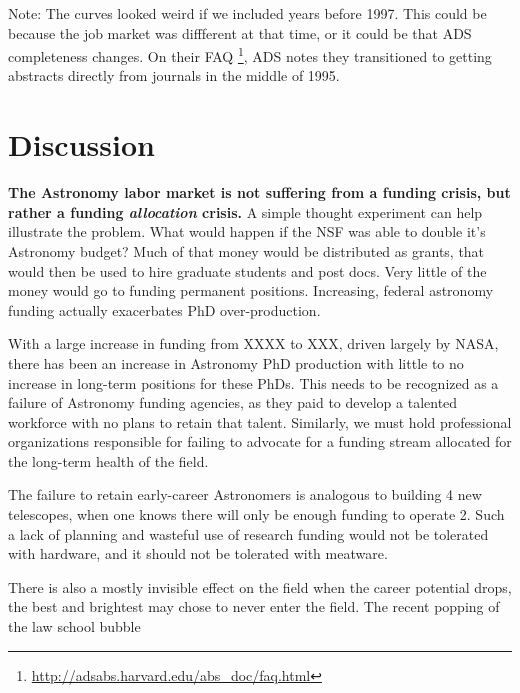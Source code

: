 \documentclass{emulateapj}
\begin{document}

Note:  The curves looked weird if we included years before 1997. This could be because the job market was diffferent at that time, or it could be that ADS completeness changes. On their FAQ \footnote{\url{http://adsabs.harvard.edu/abs\_doc/faq.html}}, ADS notes they transitioned to getting abstracts directly from journals in the middle of 1995.


\section{Discussion}

{\bf{The Astronomy labor market is not suffering from a funding crisis, but rather a funding {\emph{allocation}} crisis.}} A simple thought experiment can help illustrate the problem. What would happen if the NSF was able to double it's Astronomy budget? Much of that money would be distributed as grants, that would then be used to hire graduate students and post docs. Very little of the money would go to funding permanent positions. Increasing, federal astronomy funding actually exacerbates PhD over-production. 

With a large increase in funding from XXXX to XXX, driven largely by NASA, there has been an increase in Astronomy PhD production with little to no increase in long-term positions for these PhDs.  This needs to be recognized as a failure of Astronomy funding agencies, as they paid to develop a talented workforce with no plans to retain that talent. Similarly, we must hold professional organizations responsible for failing to advocate for a funding stream allocated for the long-term health of the field.  

The failure to retain early-career Astronomers is analogous to building 4 new telescopes, when one knows there will only be enough funding to operate 2.  Such a lack of planning and wasteful use of research funding would not be tolerated with hardware, and it should not be tolerated with meatware. 

There is also a mostly invisible effect on the field when the career potential drops, the best and brightest may chose to never enter the field.  The recent popping of the law school bubble %
\end{document}
